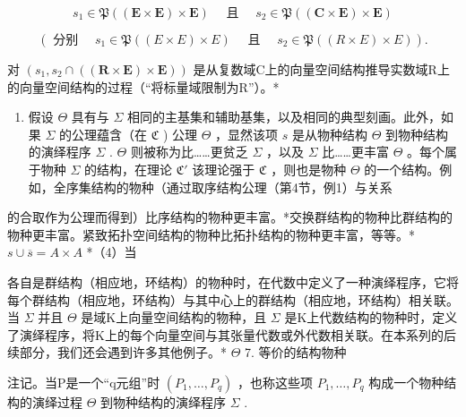 \[
s _ {1} \in \mathfrak {P} ((\mathbf {E} \times \mathbf {E}) \times \mathbf {E}) \quad \text { 且 } \quad s _ {2} \in \mathfrak {P} ((\mathbf {C} \times \mathbf {E}) \times \mathbf {E})
\]

\[
(\text { 分别 } \quad s _ {1} \in \mathfrak {P} ((E \times E) \times E) \quad \text { 且 } \quad s _ {2} \in \mathfrak {P} ((R \times E) \times E)).
\]

对 \((s_{1}, s_{2} \cap ((\mathbf{R} \times \mathbf{E}) \times \mathbf{E}))\) 是从复数域C上的向量空间结构推导实数域R上的向量空间结构的过程（“将标量域限制为R”）。*

\begin{enumerate}
\def\labelenumi{(\arabic{enumi})}
\setcounter{enumi}{2}
\tightlist
\item
  假设 \(\Theta\) 具有与 \(\Sigma\) 相同的主基集和辅助基集，以及相同的典型刻画。此外，如果 \(\Sigma\) 的公理蕴含（在 \(\mathfrak{C}\) ) 公理 \(\Theta\) ，显然该项 \(s\) 是从物种结构 \(\Theta\) 到物种结构的演绎程序 \(\Sigma\) . \(\Theta\) 则被称为比……更贫乏 \(\Sigma\) ，以及 \(\Sigma\) 比……更丰富 \(\Theta\) 。每个属于物种 \(\Sigma\) 的结构，在理论 \(\mathfrak{C}'\) 该理论强于 \(\mathfrak{C}\) ，则也是物种 \(\Theta\) 的一个结构。例如，全序集结构的物种（通过取序结构公理（第4节，例1）与关系
\end{enumerate}

的合取作为公理而得到）比序结构的物种更丰富。*交换群结构的物种比群结构的物种更丰富。紧致拓扑空间结构的物种比拓扑结构的物种更丰富，等等。* \(s \cup \overline{s} = A \times A\) *（4）当

各自是群结构（相应地，环结构）的物种时，在代数中定义了一种演绎程序，它将每个群结构（相应地，环结构）与其中心上的群结构（相应地，环结构）相关联。当 \(\Sigma\) 并且 \(\Theta\) 是域K上向量空间结构的物种，且 \(\Sigma\) 是K上代数结构的物种时，定义了演绎程序，将K上的每个向量空间与其张量代数或外代数相关联。在本系列的后续部分，我们还会遇到许多其他例子。* \(\Theta\) 7. 等价的结构物种

注记。当P是一个“q元组”时 \((P_{1}, \ldots, P_{q})\) ，也称这些项 \(P_{1}, \ldots, P_{q}\) 构成一个物种结构的演绎过程 \(\Theta\) 到物种结构的演绎程序 \(\Sigma\) .

